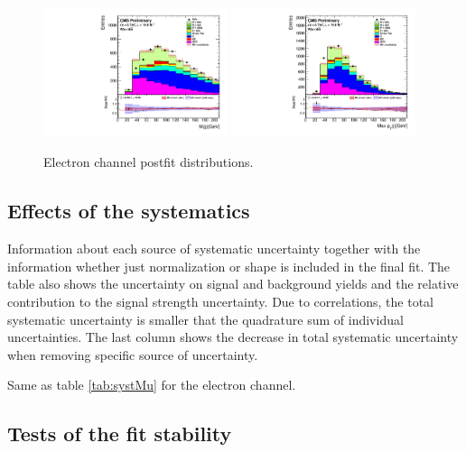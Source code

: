 \begin{figure}[htbp]
		\includegraphics[width=0.48\textwidth]{Figures/Results/Electron/postfit/Wbb_H_mass_doQCD1.pdf}
		\includegraphics[width=0.48\textwidth]{Figures/Results/Electron/postfit/Wbb_max_hJet_pt_doQCD1.pdf}		
	\caption{Electron channel postfit distributions.}
	\label{fig:Wbb_postfit_ele}
\end{figure}

\subsection{Effects of the systematics}
\label{sec:systEff}
\begin{table}
\caption[Systematics]{Information about each source of systematic uncertainty together with the information whether just normalization or shape is included in the final fit. The table also shows the uncertainty on signal and background yields and the relative contribution to the signal strength uncertainty. Due to correlations, the total systematic uncertainty is smaller that the quadrature sum of individual uncertainties. The last column shows the decrease in total systematic uncertainty when removing specific source of uncertainty.}
\label{tab:systMu}

\end{table}

\begin{table}
\caption[Systematics]{Same as table \ref{tab:systMu} for the electron channel.}
\label{tab:systEle}

\end{table}


\subsection{Tests of the fit stability}

